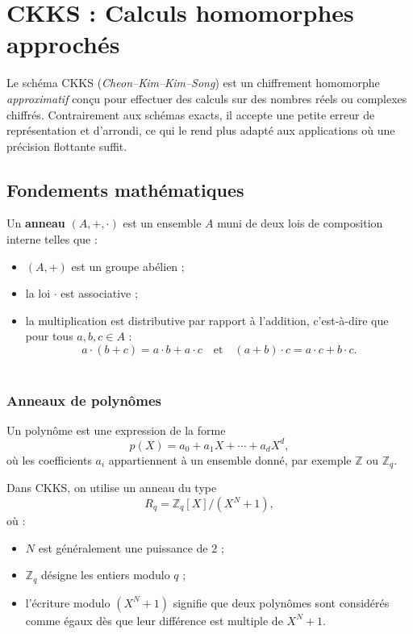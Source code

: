 \chapter{CKKS : Calculs homomorphes approchés}

Le schéma CKKS (\emph{Cheon--Kim--Kim--Song}) est un chiffrement homomorphe \emph{approximatif} conçu pour effectuer des calculs sur des nombres réels ou complexes chiffrés. Contrairement aux schémas exacts, il accepte une petite erreur de représentation et d'arrondi, ce qui le rend plus adapté aux applications où une précision flottante suffit.

\section{Fondements mathématiques}

\begin{definition}
Un \textbf{anneau} $(A, +, \cdot)$ est un ensemble $A$ muni de deux lois de composition interne telles que :
\begin{itemize}
    \item $(A, +)$ est un groupe abélien ;
    \item la loi $\cdot$ est associative ;
    \item la multiplication est distributive par rapport à l’addition, c’est-à-dire que pour tous $a,b,c \in A$ :
    \[
    a \cdot (b + c) = a \cdot b + a \cdot c \quad \text{et} \quad (a + b) \cdot c = a \cdot c + b \cdot c.
    \]\\[-0.7cm]
\end{itemize}
\end{definition}

\subsection{Anneaux de polynômes}

Un polynôme est une expression de la forme
\[
p(X)=a_0+a_1X+\cdots+a_dX^d,
\]
où les coefficients $a_i$ appartiennent à un ensemble donné, par exemple $\mathbb{Z}$ ou $\mathbb{Z}_q$.

Dans CKKS, on utilise un anneau du type
\[
R_q=\mathbb{Z}_q[X]/(X^N+1),
\]
où :
\begin{itemize}[leftmargin=2em]
  \item $N$ est généralement une puissance de $2$ ;
  \item $\mathbb{Z}_q$ désigne les entiers modulo $q$ ;
  \item l'écriture modulo $(X^N+1)$ signifie que deux polynômes sont considérés comme égaux dès que leur différence est multiple de $X^N+1$.
\end{itemize}

